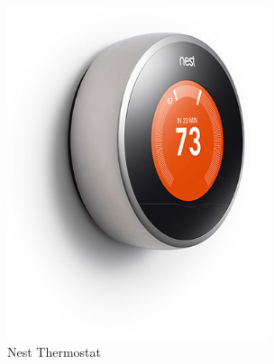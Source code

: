 \documentclass[11pt]{article}
\theoremstyle{definition}
\begin{document}





\begin{figure}
   \begin{center}
     \includegraphics [height=0.5\textwidth,width=3in]{nest.jpg}
   \end{center}
\vspace{+0.2in}
   \caption{Nest Thermostat
   \label{fig:nest}}
\vspace{-10pt}
\end{figure}


\end{document}
